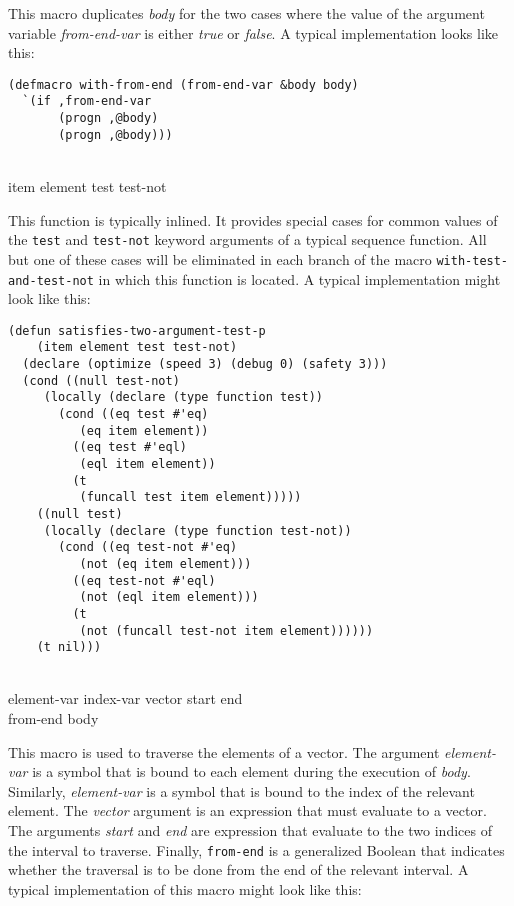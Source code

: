 This macro duplicates \textit{body} for the two cases where the value
of the argument variable \textit{from-end-var} is either \emph{true}
or \emph{false}.  A typical implementation looks like this:

{\small\begin{verbatim}
(defmacro with-from-end (from-end-var &body body)
  `(if ,from-end-var
       (progn ,@body)
       (progn ,@body)))
\end{verbatim}}

\\
{item element test test-not}

This function is typically inlined.  It provides special cases for
common values of the \texttt{test} and \texttt{test-not} keyword
arguments of a typical sequence function.  All but one of these cases
will be eliminated in each branch of the macro
\texttt{with-test-and-test-not} in which this function is located.  A
typical implementation might look like this:

{\small\begin{verbatim}
(defun satisfies-two-argument-test-p
    (item element test test-not)
  (declare (optimize (speed 3) (debug 0) (safety 3)))
  (cond ((null test-not)
	 (locally (declare (type function test))
	   (cond ((eq test #'eq)
		  (eq item element))
		 ((eq test #'eql)
		  (eql item element))
		 (t
		  (funcall test item element)))))
	((null test)
	 (locally (declare (type function test-not))
	   (cond ((eq test-not #'eq)
		  (not (eq item element)))
		 ((eq test-not #'eql)
		  (not (eql item element)))
		 (t
		  (not (funcall test-not item element))))))
	(t nil)))
\end{verbatim}}

\\
{element-var index-var vector start end\\
from-end \body body}

This macro is used to traverse the elements of a vector.  The argument
\textit{element-var} is a symbol that is bound to each element during
the execution of \textit{body}.  Similarly, \textit{element-var} is a
symbol that is bound to the index of the relevant element.  The
\textit{vector} argument is an expression that must evaluate to a
vector.  The arguments \textit{start} and \textit{end} are expression
that evaluate to the two indices of the interval to traverse.
Finally, \texttt{from-end} is a generalized Boolean that indicates
whether the traversal is to be done from the end of the relevant
interval.  A typical implementation of this macro might look like
this:

